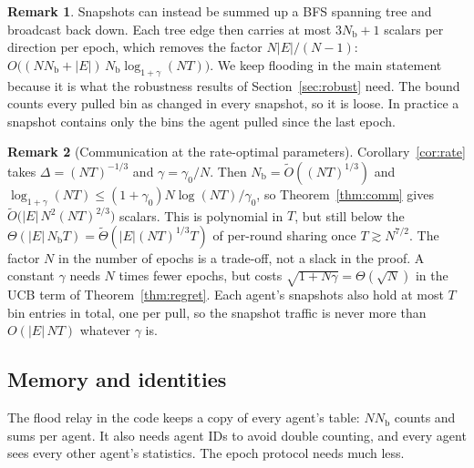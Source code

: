 \documentclass[11pt]{article}
\theoremstyle{definition}
\newtheorem{remark}{Remark}
\newcommand{\Nb}{N_{\mathrm b}}
\begin{document}
\begin{remark}
Snapshots can instead be summed up a BFS spanning tree and broadcast back down. Each tree edge then carries at most
$3\Nb+1$ scalars per direction per epoch, which removes the factor $N|E|/(N-1)$:
$O\big((N\Nb+|E|)\,\Nb\log_{1+\gamma}(NT)\big)$. We keep flooding in the main statement because it is what the
robustness results of Section~\ref{sec:robust} need. The bound counts every pulled bin as changed in every snapshot, so
it is loose. In practice a snapshot contains only the bins the agent pulled since the last epoch.
\end{remark}

\begin{remark}[Communication at the rate-optimal parameters]\label{rem:commrate}
Corollary~\ref{cor:rate} takes $\Delta=(NT)^{-1/3}$ and $\gamma=\gamma_0/N$. Then $\Nb=\tilde O((NT)^{1/3})$ and
$\log_{1+\gamma}(NT)\le(1+\gamma_0)N\log(NT)/\gamma_0$, so Theorem~\ref{thm:comm} gives $\tilde O\big(|E|\,N^2(NT)^{2/3}\big)$
scalars. This is polynomial in $T$, but still below the $\Theta(|E|\,\Nb T)=\tilde\Theta(|E|(NT)^{1/3}T)$ of per-round
sharing once $T\gtrsim N^{7/2}$. The factor $N$ in the number of epochs is a trade-off, not a slack in the proof. A
constant $\gamma$ needs $N$ times fewer epochs, but costs $\sqrt{1+N\gamma}=\Theta(\sqrt N)$ in the UCB term of
Theorem~\ref{thm:regret}. Each agent's snapshots also hold at most $T$ bin entries in total, one per pull, so the
snapshot traffic is never more than $O(|E|\,NT)$ whatever $\gamma$ is.
\end{remark}

\subsection{Memory and identities}

The flood relay in the code keeps a copy of every agent's table: $N\Nb$ counts and sums per agent. It also needs
agent IDs to avoid double counting, and every agent sees every other agent's statistics. The epoch protocol needs
much less.
\end{document}
